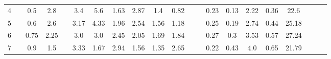 \documentclass[a4paper,12pt]{article}
\begin{document}
\begin{table}[htp]
\begin{adjustwidth}{-2cm}{}
\begin{tabular}{|c|c|c|c|c|c|c|c|c|c|c|c|c|c|c|c|c|c|c|c|c|}
4     &                      & 0.5  & 2.8  &                       & 3.4  & 5.6  & 1.63 & 2.87 & 1.4  & 0.82 &                       &                      & 0.23      & 0.13      & 2.22 & 0.36   & 22.6       &                       &                        &                      \\ \cline{1-1} \cline{3-4} \cline{6-11} \cline{14-18}
5     &                      & 0.6  & 2.6  &                       & 3.17 & 4.33 & 1.96 & 2.54 & 1.56 & 1.18 &                       &                      & 0.25      & 0.19      & 2.74 & 0.44   & 25.18      &                       &                        &                      \\ \cline{1-1} \cline{3-4} \cline{6-11} \cline{14-18}
6     &                      & 0.75 & 2.25 &                       & 3.0  & 3.0  & 2.45 & 2.05 & 1.69 & 1.84 &                       &                      & 0.27      & 0.3       & 3.53 & 0.57   & 27.24      &                       &                        &                      \\ \cline{1-1} \cline{3-4} \cline{6-11} \cline{14-18}
7     &                      & 0.9  & 1.5  &                       & 3.33 & 1.67 & 2.94 & 1.56 & 1.35 & 2.65 &                       &                      & 0.22      & 0.43      & 4.0  & 0.65   & 21.79      &                       &                        &                      \\ \hline\end{tabular}
	\end{adjustwidth}

\end{table}	
\end{document}
